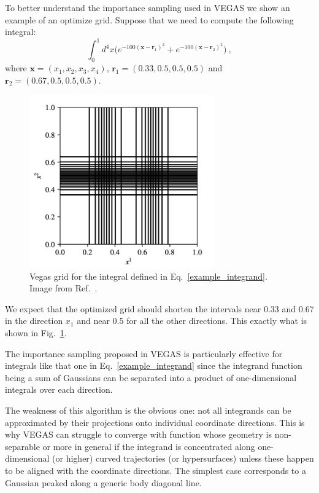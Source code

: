 \documentclass[../main/main.tex]{subfiles}
\begin{document}
To better understand the importance sampling used in VEGAS we show an example of an optimize grid.
Suppose that we need to compute the following integral:
\begin{equation}
	\label{example_integrand}
	\int_0^1 d^4 x \big(e^{-100(\textbf{x}- \textbf{r}_1)^2} + e^{-100(\textbf{x}- \textbf{r}_2)^2} \big) \ ,
\end{equation}
where $\textbf{x} = (x_1, x_2, x_3, x_4)$, $\textbf{r}_1 = (0.33, 0.5, 0.5, 0.5)$ and $\textbf{r}_2 = (0.67, 0.5, 0.5, 0.5)$.
\begin{figure}
	\centering
	\includegraphics[width=8cm]{../images/vegas_grid.png}
	\caption{Vegas grid for the integral defined in Eq.~\ref{example_integrand}. Image from Ref.~\cite{Lepage:2020tgj}.}
	\label{vegas_grid}
\end{figure}
We expect that the optimized grid should shorten the intervals near $0.33$ and $0.67$ in the direction $x_1$ and near $0.5$ for all the 
other directions. This exactly what is shown in Fig.~\ref{vegas_grid}.

The importance sampling proposed in VEGAS is particularly effective for integrals like that one in Eq.~\ref{example_integrand} since the integrand function being a sum of Gaussians can be separated into a product of one-dimensional integrals over each direction.

The weakness of this algorithm is the obvious one: not all integrands can be approximated by their projections onto individual coordinate
directions. This is why VEGAS can struggle to converge with function whose geometry is non-separable or more in general if the integrand
is concentrated along one-dimensional (or higher) curved trajectories (or hypersurfaces) unless these happen to be aligned with the coordinate directions. The simplest case corresponds to a Gaussian peaked along a generic body diagonal line.
\end{document}
